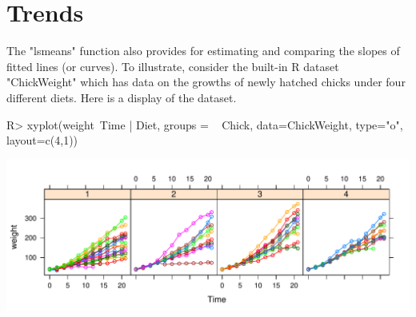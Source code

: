 \documentclass{article}
\begin{document}
\section{Trends}
The "lsmeans" function also provides for estimating and comparing the slopes of fitted lines (or curves). To illustrate, consider the built-in R dataset "ChickWeight" which has data on the growths of newly hatched chicks under four different diets. Here is a display of the dataset.
\begin{Winput}
R> xyplot(weight~Time | Diet, groups = ~ Chick, data=ChickWeight, type="o", layout=c(4,1))
\end{Winput}
\includegraphics[scale=.8]{using-lsmeans-chick-plot-fig.pdf}
\end{document}
